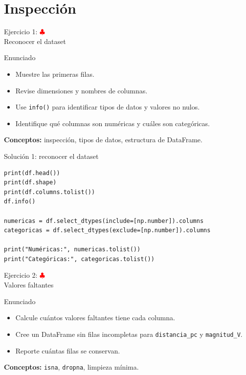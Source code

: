\documentclass[10pt]{beamer}
\begin{document}
\section{Inspección}

\begin{frame}{Ejercicio 1: \hfill \textcolor{red}{$\clubsuit$} \\ Reconocer el dataset}
  \begin{block}{Enunciado}
    \begin{itemize}
      \item Muestre las primeras filas.
      \item Revise dimensiones y nombres de columnas.
      \item Use \texttt{info()} para identificar tipos de datos y valores no nulos.
      \item Identifique qué columnas son numéricas y cuáles son categóricas.
    \end{itemize}
  \end{block}
  \textbf{Conceptos:} inspección, tipos de datos, estructura de DataFrame.
\end{frame}

\begin{solutionblock}
\begin{frame}[fragile,shrink=5]{Solución 1: reconocer el dataset}
\begin{verbatim}
print(df.head())
print(df.shape)
print(df.columns.tolist())
df.info()

numericas = df.select_dtypes(include=[np.number]).columns
categoricas = df.select_dtypes(exclude=[np.number]).columns

print("Numéricas:", numericas.tolist())
print("Categóricas:", categoricas.tolist())
\end{verbatim}
\end{frame}
\end{solutionblock}

\begin{frame}{Ejercicio 2: \hfill \textcolor{red}{$\clubsuit$} \\ Valores faltantes}
  \begin{block}{Enunciado}
    \begin{itemize}
      \item Calcule cuántos valores faltantes tiene cada columna.
      \item Cree un DataFrame sin filas incompletas para \texttt{distancia\_pc} y \texttt{magnitud\_V}.
      \item Reporte cuántas filas se conservan.
    \end{itemize}
  \end{block}
  \textbf{Conceptos:} \texttt{isna}, \texttt{dropna}, limpieza mínima.
\end{frame}
\end{document}
